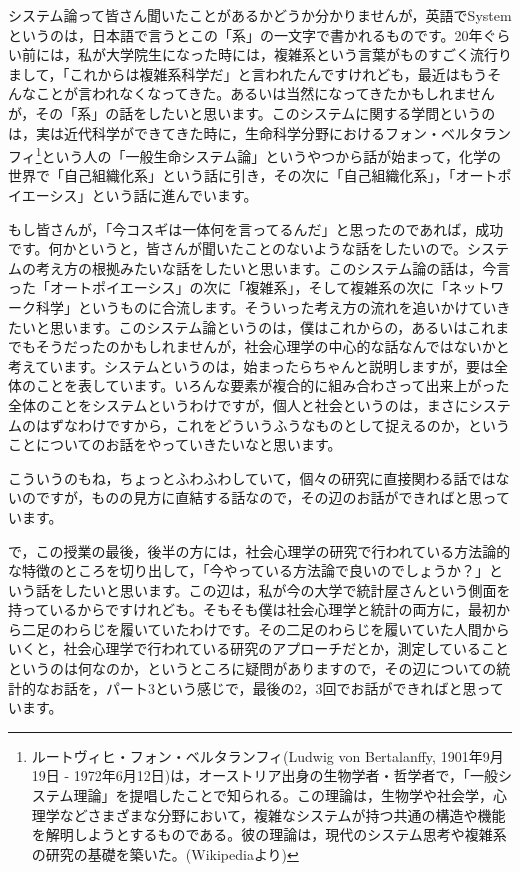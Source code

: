 \documentclass{ltjsbook}
\begin{document}
システム論って皆さん聞いたことがあるかどうか分かりませんが，英語でSystemというのは，日本語で言うとこの「系」の一文字で書かれるものです。20年ぐらい前には，私が大学院生になった時には，複雑系という言葉がものすごく流行りまして，「これからは複雑系科学だ」と言われたんですけれども，最近はもうそんなことが言われなくなってきた。あるいは当然になってきたかもしれませんが，その「系」の話をしたいと思います。このシステムに関する学問というのは，実は近代科学ができてきた時に，生命科学分野におけるフォン・ベルタランフィ\footnote{ルートヴィヒ・フォン・ベルタランフィ(Ludwig von Bertalanffy, 1901年9月19日 - 1972年6月12日)は，オーストリア出身の生物学者・哲学者で，「一般システム理論」を提唱したことで知られる。この理論は，生物学や社会学，心理学などさまざまな分野において，複雑なシステムが持つ共通の構造や機能を解明しようとするものである。彼の理論は，現代のシステム思考や複雑系の研究の基礎を築いた。(Wikipediaより)}という人の「一般生命システム論」というやつから話が始まって，化学の世界で「自己組織化系」という話に引き，その次に「自己組織化系」，「オートポイエーシス」という話に進んでいます。

もし皆さんが，「今コスギは一体何を言ってるんだ」と思ったのであれば，成功です。何かというと，皆さんが聞いたことのないような話をしたいので。システムの考え方の根拠みたいな話をしたいと思います。このシステム論の話は，今言った「オートポイエーシス」の次に「複雑系」，そして複雑系の次に「ネットワーク科学」というものに合流します。そういった考え方の流れを追いかけていきたいと思います。このシステム論というのは，僕はこれからの，あるいはこれまでもそうだったのかもしれませんが，社会心理学の中心的な話なんではないかと考えています。システムというのは，始まったらちゃんと説明しますが，要は全体のことを表しています。いろんな要素が複合的に組み合わさって出来上がった全体のことをシステムというわけですが，個人と社会というのは，まさにシステムのはずなわけですから，これをどういうふうなものとして捉えるのか，ということについてのお話をやっていきたいなと思います。

こういうのもね，ちょっとふわふわしていて，個々の研究に直接関わる話ではないのですが，ものの見方に直結する話なので，その辺のお話ができればと思っています。

で，この授業の最後，後半の方には，社会心理学の研究で行われている方法論的な特徴のところを切り出して，「今やっている方法論で良いのでしょうか？」という話をしたいと思います。この辺は，私が今の大学で統計屋さんという側面を持っているからですけれども。そもそも僕は社会心理学と統計の両方に，最初から二足のわらじを履いていたわけです。その二足のわらじを履いていた人間からいくと，社会心理学で行われている研究のアプローチだとか，測定していることというのは何なのか，というところに疑問がありますので，その辺についての統計的なお話を，パート3という感じで，最後の2，3回でお話ができればと思っています。
\end{document}
